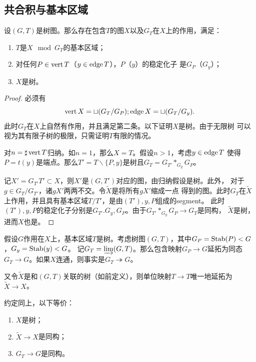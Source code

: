\subsection{共合积与基本区域}
\begin{theorem}
    设$(G,T)$是树图。那么存在包含$T$的图$X$以及$G_T$在$X$上的作用，满足：
    \begin{enumerate}
        \item $T$是$X \mod G_T$的基本区域；
        \item 对任何$P \in \operatorname{vert} T$（$y \in \operatorname{edge} T$），$P$（$y$）的稳定化子
        是$G_P$（$G_y$）；
        \item $X$是树。
    \end{enumerate}
\end{theorem}
\begin{proof}
    必须有\[\operatorname{vert} X = \sqcup (G_T/G_P);\operatorname{edge} X = \sqcup (G_T/G_y).\]
    此时$G_T$在$X$上自然有作用，并且满足第二条。以下证明$X$是树。由于无限树
    可以视为其有限子树的极限，只需证明$T$有限的情况。

    对$n = \sharp \operatorname{vert} T$归纳。如$n = 1$，那么$X = T$。假设$n > 1$，考虑$y \in \operatorname{edge} T$
    使得$P = t(y)$是端点。那么$T' = T\backslash \{P,y\}$是树且$G_T = G_{T'} *_{G_y} G_P$。

    记$X' = G_{T'}T' \subset X$，则$X'$是$(G,T')$对应的图，由归纳假设是树。此外，
    对于$g \in G_T/G_{T'}$，诸$gX'$两两不交。令$\tilde{X}$是将所有$gX'$缩成一点
    得到的图。此时$G_T$在$\tilde{X}$上作用，并且具有基本区域$T/T'$，是由$(T'),y,P$组成的segment。
    此时$(T'),y,P$的稳定化子分别是$G_{T'}.G_y,G_P$。由于$G_{T'} *_{G_y} G_P \to G_T$是同构，
    $\tilde{X}$是树，进而$X$也是。
\end{proof}
假设$G$作用在$X$上，基本区域$T$是树。考虑树图$(G,T)$，其中$G_P = \operatorname{Stab}(P) < G$，$G_y = \operatorname{Stab}(y) < G$。
记$G_T = \varinjlim (G,T)$。那么包含映射$G_P \to G$延拓为同态$G_T \to G$。如果$X$连通，则事实是$G_T \twoheadrightarrow G$。

又令$\tilde{X}$是和$(G,T)$关联的树（如前定义），则单位映射$T \to T$唯一地延拓为
$\tilde{X} \to X$。
\begin{theorem}
    约定同上，以下等价：
    \begin{enumerate}
        \item $X$是树；
        \item $\tilde{X}\to X$是同构；
        \item $G_T \to G$是同构。
    \end{enumerate}
\end{theorem}
